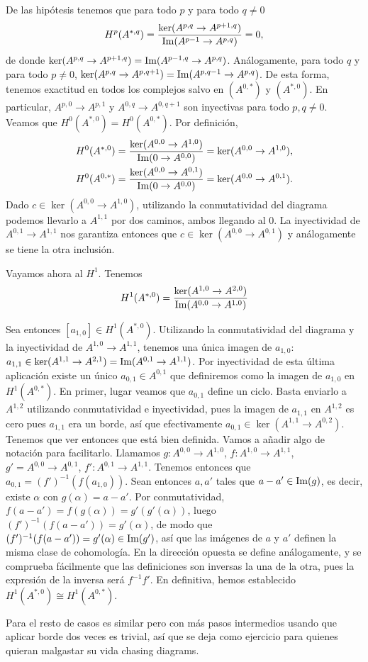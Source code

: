 \documentclass[twoside]{article}
\begin{document}
\begin{solucion}
De las hipótesis tenemos que para todo $p$ y para todo $q\neq 0$
\[
H^p(A^{*,q})=\frac{\ker(A^{p,q}\to A^{p+1,q})}{\operatorname{Im}(A^{p-1}\to A^{p,q})}=0,
\]
de donde $\ker(A^{p,q}\to A^{p+1,q})=\operatorname{Im}(A^{p-1,q}\to A^{p,q})$. Análogamente, para todo $q$ y para todo $p\neq 0$, $\ker(A^{p,q}\to A^{p,q+1})=\operatorname{Im}(A^{p,q-1}\to A^{p,q})$. De esta forma, tenemos exactitud en todos los complejos salvo en $(A^{0,*})$ y $(A^{*,0})$. En particular, $A^{p,0}\to A^{p,1}$ y $A^{0,q}\to A^{0,q+1}$ son inyectivas para todo $p,q\neq 0$. Veamos que $H^0(A^{*,0})= H^0(A^{0,*})$. Por definición, 
\begin{align*}
& H^0(A^{*,0})=\frac{\ker(A^{0,0}\to A^{1,0})}{\operatorname{Im}(0\to A^{0,0})}=\ker(A^{0,0}\to A^{1,0}),\\
& H^0(A^{0,*})= \frac{\ker(A^{0,0}\to A^{0,1})}{\operatorname{Im}(0\to A^{0,0})}=\ker(A^{0,0}\to A^{0,1}).
\end{align*}
Dado $c\in \ker(A^{0,0}\to A^{1,0})$, utilizando la conmutatividad del diagrama podemos llevarlo a $A^{1,1}$ por dos caminos, ambos llegando al 0. La inyectividad de $A^{0,1}\to A^{1,1}$ nos garantiza entonces que $c\in \ker(A^{0,0}\to A^{0,1})$ y análogamente se tiene la otra inclusión. 

Vayamos ahora al $H^1$. Tenemos
$$
H^1(A^{*,0})=\frac{\ker(A^{1,0}\to A^{2,0})}{\operatorname{Im}(A^{0,0}\to A^{1,0})}
$$

Sea entonces $[a_{1,0}]\in H^1(A^{*,0})$. Utilizando la conmutatividad del diagrama y la inyectividad de $A^{1,0}\to A^{1,1}$, tenemos una única imagen de $a_{1,0}$: $a_{1,1}\in \ker(A^{1,1}\to A^{2,1})=\operatorname{Im}(A^{0,1}\to A^{1,1})$. Por inyectividad de esta última aplicación existe un único $a_{0,1}\in A^{0,1}$ que definiremos como la imagen de $a_{1,0}$ en $H^1(A^{0,*})$. En primer, lugar veamos que $a_{0,1}$ define un ciclo. Basta enviarlo a $A^{1,2}$ utilizando conmutatividad e inyectividad, pues la imagen de $a_{1,1}$ en $A^{1,2}$ es cero pues $a_{1,1}$ era un borde, así que efectivamente $a_{0,1}\in\ker(A^{1,1}\to A^{0,2})$. Tenemos que ver entonces que está bien definida. Vamos a añadir algo de notación para facilitarlo. Llamamos $g:A^{0,0}\to A^{1,0}$, $f:A^{1,0}\to A^{1,1}$, $g'=A^{0,0}\to A^{0,1}$, $f':A^{0,1}\to A^{1,1}$. Tenemos entonces que $a_{0,1}=(f')^{-1}(f(a_{1,0}))$. Sean entonces $a,a'$ tales que $a-a'\in \operatorname{Im}(g)$, es decir, existe $\alpha$ con $g(\alpha)=a-a'$. Por conmutatividad, $f(a-a')=f(g(\alpha))=g'(g'(\alpha))$, luego $(f')^{-1}(f(a-a'))=g'(\alpha)$, de modo que  $(f')^{-1}(f(a-a'))=g'(\alpha)\in\operatorname{Im}(g')$, así que las imágenes de $a$ y $a'$ definen la misma clase de cohomología. En la dirección opuesta se define análogamente, y se comprueba fácilmente que las definiciones son inversas la una de la otra, pues la expresión de la inversa será $f^{-1}f'$. En definitiva, hemos establecido $ H^1(A^{*,0})\cong  H^1(A^{0,*})$.

Para el resto de casos es similar pero con más pasos intermedios usando que aplicar borde dos veces es trivial, así que se deja como ejercicio para quienes quieran malgastar su vida chasing diagrams.
\end{solucion}
\newpage
\end{document}
